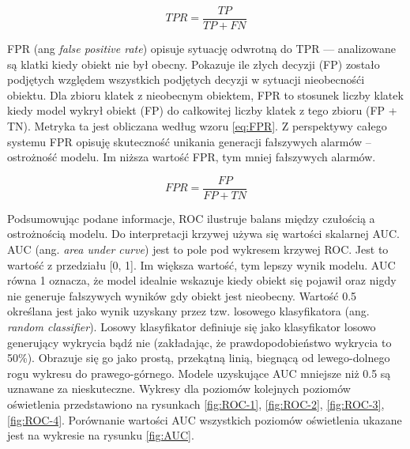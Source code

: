 \begin{equation}
    TPR = \frac{TP}{TP + FN}
    \label{eq:TPR}
\end{equation}

FPR (ang \emph{false positive rate}) opisuje sytuację odwrotną do TPR --- analizowane są klatki kiedy obiekt nie był obecny. Pokazuje ile złych decyzji (FP) zostało podjętych względem wszystkich podjętych decyzji w sytuacji nieobecnośći obiektu. Dla zbioru klatek z nieobecnym obiektem, FPR to stosunek liczby klatek kiedy model wykrył obiekt (FP) do całkowitej liczby klatek z tego zbioru (FP + TN). Metryka ta jest obliczana według wzoru \ref{eq:FPR}. Z perspektywy całego systemu FPR opisuję skuteczność unikania generacji fałszywych alarmów -- ostrożność modelu. Im niższa wartość FPR, tym mniej fałszywych alarmów.


\begin{equation}
    FPR = \frac{FP}{FP + TN}
    \label{eq:FPR}
\end{equation}

Podsumowując podane informacje, ROC ilustruje balans między czułością a ostrożnością modelu. Do interpretacji krzywej używa się wartości skalarnej AUC. AUC (ang. \emph{area under curve}) jest to pole pod wykresem krzywej ROC. Jest to wartość z przedziału [0, 1]. Im większa wartość, tym lepszy wynik modelu. AUC równa 1 oznacza, że model idealnie wskazuje kiedy obiekt się pojawił oraz nigdy nie generuje fałszywych wyników gdy obiekt jest nieobecny. Wartość 0.5 określana jest jako wynik uzyskany przez tzw. losowego klasyfikatora (ang. \emph{random classifier}). Losowy klasyfikator definiuje się jako klasyfikator losowo generujący wykrycia bądź nie (zakładając, że prawdopodobieństwo wykrycia to 50\%). Obrazuje się go jako prostą, przekątną linią, biegnącą od lewego-dolnego rogu wykresu do prawego-górnego. Modele uzyskujące AUC mniejsze niż 0.5 są uznawane za nieskuteczne. 
Wykresy dla poziomów kolejnych poziomów oświetlenia przedstawiono na rysunkach \ref{fig:ROC-1}, \ref{fig:ROC-2}, \ref{fig:ROC-3}, \ref{fig:ROC-4}. Porównanie wartości AUC wszystkich poziomów oświetlenia ukazane jest na wykresie na rysunku \ref{fig:AUC}.



